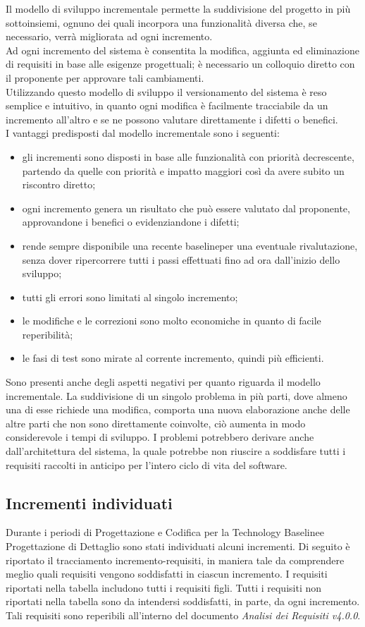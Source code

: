 Il modello di sviluppo incrementale permette la suddivisione del progetto in più sottoinsiemi,
ognuno dei quali incorpora una funzionalità diversa che, se necessario, verrà migliorata ad ogni incremento.  \\
Ad ogni incremento del sistema è consentita la modifica, aggiunta ed eliminazione di requisiti in base alle esigenze progettuali; 
è necessario un colloquio diretto con il proponente per approvare tali cambiamenti. \\
Utilizzando questo modello di sviluppo il versionamento del sistema è reso semplice e intuitivo, in quanto ogni modifica è facilmente tracciabile da un incremento all'altro e se ne possono valutare direttamente i difetti o benefici.\\
I vantaggi predisposti dal modello incrementale sono i seguenti:
\begin{itemize}
	\item gli incrementi sono disposti in base alle funzionalità con priorità decrescente, partendo da quelle con priorità e impatto maggiori
	così da avere subito un riscontro diretto;
	\item ogni incremento genera un risultato che può essere valutato dal proponente, approvandone i benefici o evidenziandone i difetti;
	\item rende sempre disponibile una recente baseline\glosp per una eventuale rivalutazione, senza dover ripercorrere tutti i passi effettuati fino ad ora dall'inizio dello sviluppo;
	\item tutti gli errori sono limitati al singolo incremento;
	\item le modifiche e le correzioni sono molto economiche in quanto di facile reperibilità;
	\item le fasi di test sono mirate al corrente incremento, quindi più efficienti.
\end{itemize}
Sono presenti anche degli aspetti negativi per quanto riguarda il modello incrementale. La suddivisione di un singolo problema in più parti, dove almeno una di esse richiede una modifica, comporta una nuova elaborazione anche delle altre parti che non sono direttamente coinvolte, ciò aumenta in modo considerevole i tempi di sviluppo.
I problemi potrebbero derivare anche dall'architettura del sistema, la quale potrebbe non riuscire a soddisfare tutti i requisiti raccolti in anticipo per l'intero ciclo di vita del software.

\subsection{Incrementi individuati}
Durante i periodi di Progettazione e Codifica per la Technology Baseline\glosp e Progettazione di Dettaglio sono stati individuati alcuni incrementi. Di seguito è riportato il tracciamento incremento-requisiti, in maniera tale da comprendere meglio quali requisiti vengono soddisfatti in ciascun incremento. I requisiti riportati nella tabella includono tutti i requisiti figli. Tutti i requisiti non riportati nella tabella sono da intendersi soddisfatti, in parte, da ogni incremento. Tali requisiti sono reperibili all’interno del documento \textit{Analisi dei Requisiti v4.0.0}.


